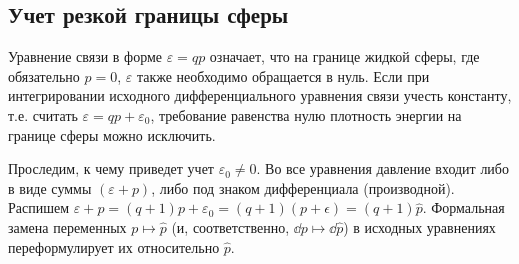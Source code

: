 \documentclass[\docroot/reports/draft/report.tex]{subfiles}
\begin{document}
\subsection{Учет резкой границы сферы}

    Уравнение связи в форме $\varepsilon = q p$ означает, что на границе жидкой сферы, где обязательно $p = 0$, $\varepsilon$ также необходимо обращается в нуль. Если при интегрировании исходного дифференциального уравнения связи учесть константу, т.е. считать $\varepsilon = q p + \varepsilon_0$, требование равенства нулю плотность энергии на границе сферы можно исключить.

    Проследим, к чему приведет учет $\varepsilon_0 \neq 0$. Во все уравнения давление входит либо в виде суммы $(\varepsilon + p)$, либо под знаком дифференциала (производной). Распишем $\varepsilon + p = (q + 1) p + \varepsilon_0 = (q + 1) (p + \epsilon) = (q + 1) \hat{p}$. Формальная замена переменных $p \mapsto \hat{p}$ (и, соответственно, $\dd{p} \mapsto \dd{\hat{p}}$) в исходных уравнениях переформулирует их относительно $\hat{p}$.

\end{document}
